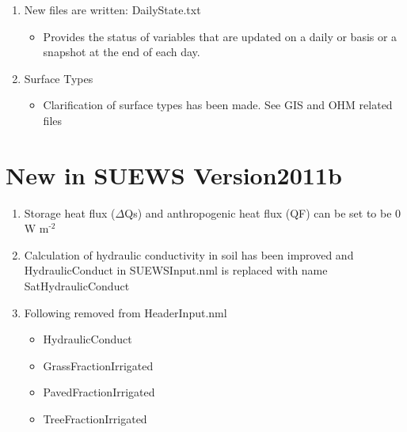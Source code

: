 \documentclass[letterpaper,10pt,english]{sphinxmanual}
\begin{document}
\begin{enumerate}
\item {} 
New files are written: DailyState.txt
\begin{itemize}
\item {} 
Provides the status of variables that are updated on a daily or
basis or a snapshot at the end of each day.

\end{itemize}

\item {} 
Surface Types
\begin{itemize}
\item {} 
Clarification of surface types has been made. See GIS and OHM
related files

\end{itemize}

\end{enumerate}


\section{New in SUEWS Version2011b}
\label{\detokenize{version-history:new-in-suews-version2011b}}\begin{enumerate}
\item {} 
Storage heat flux (\(\Delta\)Qs) and anthropogenic heat flux (QF) can be set
to be 0 W m$^{\text{-2}}$

\item {} 
Calculation of hydraulic conductivity in soil has been improved and
HydraulicConduct in SUEWSInput.nml is replaced with name
SatHydraulicConduct

\item {} 
Following removed from HeaderInput.nml
\begin{itemize}
\item {} 
HydraulicConduct

\item {} 
GrassFractionIrrigated

\item {} 
PavedFractionIrrigated

\item {} 
TreeFractionIrrigated

\end{itemize}

\end{enumerate}
\end{document}
